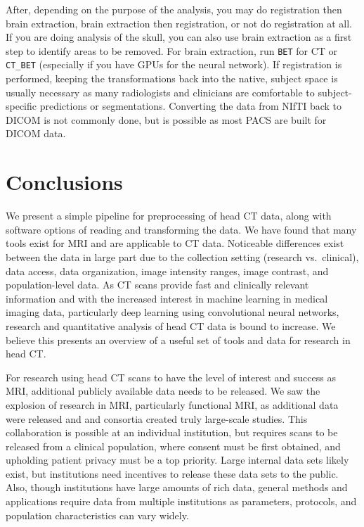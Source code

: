 \documentclass[utf8]{frontiersSCNS}
\begin{document}
After, depending on the purpose of the analysis, you may do registration then brain extraction, brain extraction then registration, or not do registration at all. If you are doing analysis of the skull, you can also use brain extraction as a first step to identify areas to be removed. For brain extraction, run \texttt{BET} for CT or \texttt{CT\_BET} (especially if you have GPUs for the neural network). If registration is performed, keeping the transformations back into the native, subject space is usually necessary as many radiologists and clinicians are comfortable to subject-specific predictions or segmentations. Converting the data from NIfTI back to DICOM is not commonly done, but is possible as most PACS are built for DICOM data.

\hypertarget{conclusions}{%
\section{Conclusions}\label{conclusions}}

We present a simple pipeline for preprocessing of head CT data, along with software options of reading and transforming the data. We have found that many tools exist for MRI and are applicable to CT data. Noticeable differences exist between the data in large part due to the collection setting (research vs.~clinical), data access, data organization, image intensity ranges, image contrast, and population-level data. As CT scans provide fast and clinically relevant information and with the increased interest in machine learning in medical imaging data, particularly deep learning using convolutional neural networks, research and quantitative analysis of head CT data is bound to increase. We believe this presents an overview of a useful set of tools and data for research in head CT.

For research using head CT scans to have the level of interest and success as MRI, additional publicly available data needs to be released. We saw the explosion of research in MRI, particularly functional MRI, as additional data were released and and consortia created truly large-scale studies. This collaboration is possible at an individual institution, but requires scans to be released from a clinical population, where consent must be first obtained, and upholding patient privacy must be a top priority. Large internal data sets likely exist, but institutions need incentives to release these data sets to the public. Also, though institutions have large amounts of rich data, general methods and applications require data from multiple institutions as parameters, protocols, and population characteristics can vary widely.
\end{document}
